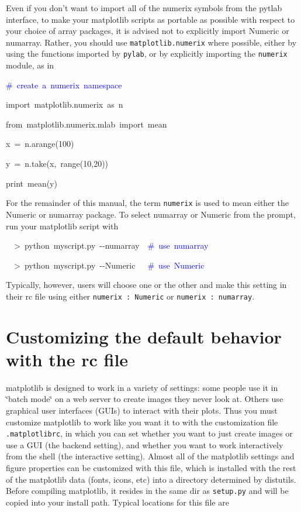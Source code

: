 Even if you don't want to import all of the numerix symbols from the
pytlab interface, to make your matplotlib scripts as portable as possible
with respect to your choice of array packages, it is advised not to
explicitly import Numeric or numarray. Rather, you should use \texttt{matplotlib.numerix}
where possible, either by using the functions imported by \texttt{pylab},
or by explicitly importing the \texttt{numerix} module, as in 

\begin{lyxcode}
\textcolor{blue}{\#~create~a~numerix~namespace}

import~matplotlib.numerix~as~n

from~matplotlib.numerix.mlab~import~mean

x~=~n.arange(100)

y~=~n.take(x,~range(10,20))

print~mean(y)
\end{lyxcode}
For the remainder of this manual, the term \texttt{numerix} is used
to mean either the Numeric or numarray package. To select numarray
or Numeric from the prompt, run your matplotlib script with

\begin{lyxcode}
~~>~python~myscript.py~-{}-numarray~~\textcolor{blue}{\#~use~numarray}

~~>~python~myscript.py~-{}-Numeric~~~\textcolor{blue}{\#~use~Numeric}
\end{lyxcode}
Typically, however, users will choose one or the other and make this
setting in their rc file using either \texttt{numerix : Numeric} or
\texttt{numerix : numarray}. 


\section[matplotlibrc]{Customizing the default behavior with the rc file}

matplotlib is designed to work in a variety of settings: some people
use it in \char`\"{}batch mode\char`\"{} on a web server to create
images they never look at. Others use graphical user interfaces (GUIs)
to interact with their plots. Thus you must customize matplotlib to
work like you want it to with the customization file \texttt{.matplotlibrc},
in which you can set whether you want to just create images or use
a GUI (the backend setting), and whether you want to work interactively
from the shell (the interactive setting). Almost all of the matplotlib
settings and figure properties can be customized with this file, which
is installed with the rest of the matplotlib data (fonts, icons, etc)
into a directory determined by distutils. Before compiling matplotlib,
it resides in the same dir as \texttt{setup.py} and will be copied
into your install path. Typical locations for this file are 

